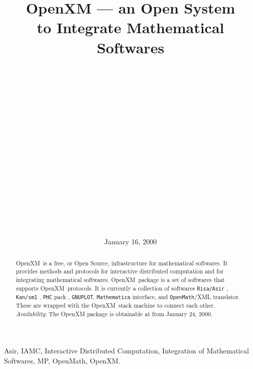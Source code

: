 \documentclass[submit]{acmconf}
\def\OpenXM{{\rm OpenXM\ }}
\begin{document}
\date{January 16, 2000}
\title{OpenXM 
      --- an Open System \\ to Integrate Mathematical Softwares}
\author{\\
         \\
         \\
         \and
         \\
         \\
         \and
         \\
         \\
         \and
         \\
         \\
         \and
         \\
         \\
         \and
         \\
         \\
       }
\maketitle

\begin{abstract}
\OpenXM is a free, or Open Source, infrastructure for mathematical
softwares.
It provides methods and protocols 
for interactive distributed computation and
for integrating mathematical softwares.
\OpenXM package is a set of softwares that supports \OpenXM protocols.
It is currently a collection of softwares
{\tt Risa/Asir} \cite{asir}, {\tt Kan/sm1} \cite{kan}, {\tt PHC} pack \cite{phc}, {\tt GNUPLOT},
{\tt Mathematica} interface, and
{\tt OpenMath}/XML \cite{OpenMath} translator.
These are wrapped with the \OpenXM stack machine
to connect each other.
{\it Availability}: The OpenXM package is obtainable at \cite{openxm-web}
from January 24, 2000.
\end{abstract}

\begin{keywords}
Asir,
IAMC, Interactive Distributed Computation, 
Integration of Mathematical Softwares,
MP, OpenMath, OpenXM. 
\end{keywords}




















\end{document}
